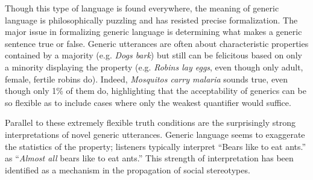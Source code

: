 \documentclass[11pt,letterpaper]{letter} %
\begin{document}
\begin{letter}
Though this type of language is found everywhere, the meaning of generic language is philosophically puzzling and has resisted precise formalization. 
The major issue in formalizing generic language is determining what makes a generic sentence true or false.
Generic utterances are often about characteristic properties contained by a majority (e.g. \emph{Dogs bark}) but still can be felicitous based on only a minority displaying the property (e.g. \emph{Robins lay eggs}, even though only adult, female, fertile robins do). 
Indeed, \emph{Mosquitos carry malaria} sounds true, even though only 1\% of them do, highlighting that the acceptability of generics can be so flexible as to include cases where only the weakest quantifier would suffice. 

Parallel to these extremely flexible truth conditions are the surprisingly strong interpretations of novel generic utterances.
Generic language seems to exaggerate the statistics of the property; listeners typically interpret ``Bears like to eat ants.'' as ``\emph{Almost all} bears like to eat ants.''
This strength of interpretation has been identified as a mechanism in the propagation of social stereotypes. 


% 


\end{letter}
\end{document}
